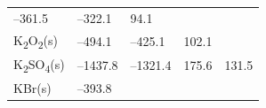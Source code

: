 \documentclass[
  9pt,
]{extbook}
\theoremstyle{definition}
\theoremstyle{definition}
\theoremstyle{definition}
\theoremstyle{remark}
\begin{document}
\begin{longtable}[]{@{}lllll@{}}
\begin{minipage}[t]{0.19\columnwidth}
--361.5\strut
\end{minipage} & \begin{minipage}[t]{0.20\columnwidth}\raggedright
--322.1\strut
\end{minipage} & \begin{minipage}[t]{0.18\columnwidth}\raggedright
94.1\strut
\end{minipage} & \begin{minipage}[t]{0.18\columnwidth}\raggedright
\strut
\end{minipage}\tabularnewline
\begin{minipage}[t]{0.10\columnwidth}\raggedright
K\textsubscript{2}O\textsubscript{2}(s)\strut
\end{minipage} & \begin{minipage}[t]{0.19\columnwidth}\raggedright
--494.1\strut
\end{minipage} & \begin{minipage}[t]{0.20\columnwidth}\raggedright
--425.1\strut
\end{minipage} & \begin{minipage}[t]{0.18\columnwidth}\raggedright
102.1\strut
\end{minipage} & \begin{minipage}[t]{0.18\columnwidth}\raggedright
\strut
\end{minipage}\tabularnewline
\begin{minipage}[t]{0.10\columnwidth}\raggedright
K\textsubscript{2}SO\textsubscript{4}(s)\strut
\end{minipage} & \begin{minipage}[t]{0.19\columnwidth}\raggedright
--1437.8\strut
\end{minipage} & \begin{minipage}[t]{0.20\columnwidth}\raggedright
--1321.4\strut
\end{minipage} & \begin{minipage}[t]{0.18\columnwidth}\raggedright
175.6\strut
\end{minipage} & \begin{minipage}[t]{0.18\columnwidth}\raggedright
131.5\strut
\end{minipage}\tabularnewline
\begin{minipage}[t]{0.10\columnwidth}\raggedright
KBr(s)\strut
\end{minipage} & \begin{minipage}[t]{0.19\columnwidth}\raggedright
--393.8\strut
\end{minipage} & \begin{minipage}[t]{0.20\columnwidth}\raggedright

\end{minipage}
\end{longtable}
\end{document}
